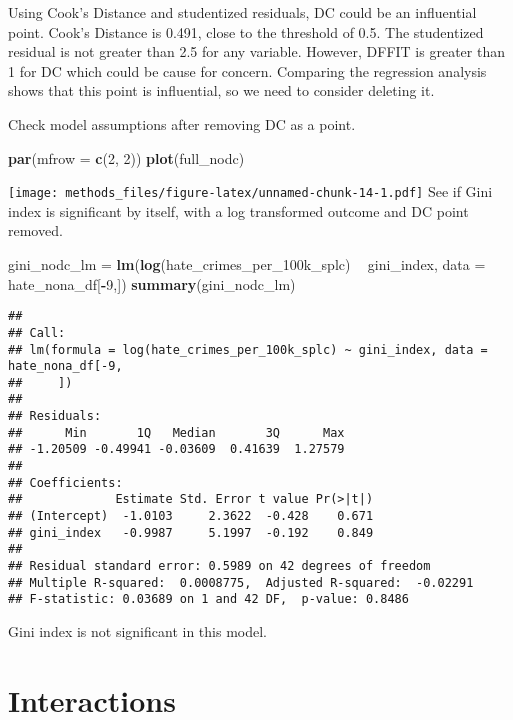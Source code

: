 \documentclass[
]{article}
\newenvironment{Shaded}{\begin{snugshade}}{\end{snugshade}}
\newcommand{\DataTypeTok}[1]{\textcolor[rgb]{0.13,0.29,0.53}{#1}}
\newcommand{\DecValTok}[1]{\textcolor[rgb]{0.00,0.00,0.81}{#1}}
\newcommand{\KeywordTok}[1]{\textcolor[rgb]{0.13,0.29,0.53}{\textbf{#1}}}
\newcommand{\NormalTok}[1]{#1}
\newcommand{\OperatorTok}[1]{\textcolor[rgb]{0.81,0.36,0.00}{\textbf{#1}}}
\newcommand{\StringTok}[1]{\textcolor[rgb]{0.31,0.60,0.02}{#1}}
\begin{document}
Using Cook's Distance and studentized residuals, DC could be an
influential point. Cook's Distance is 0.491, close to the threshold of
0.5. The studentized residual is not greater than 2.5 for any variable.
However, DFFIT is greater than 1 for DC which could be cause for
concern. Comparing the regression analysis shows that this point is
influential, so we need to consider deleting it.

Check model assumptions after removing DC as a point.

\begin{Shaded}
\begin{Highlighting}[]
\KeywordTok{par}\NormalTok{(}\DataTypeTok{mfrow =} \KeywordTok{c}\NormalTok{(}\DecValTok{2}\NormalTok{, }\DecValTok{2}\NormalTok{))}
\KeywordTok{plot}\NormalTok{(full_nodc)}
\end{Highlighting}
\end{Shaded}

\texttt{[image: methods\_files/figure-latex/unnamed-chunk-14-1.pdf]} See
if Gini index is significant by itself, with a log transformed outcome
and DC point removed.

\begin{Shaded}
\begin{Highlighting}[]
\NormalTok{gini_nodc_lm =}\StringTok{ }\KeywordTok{lm}\NormalTok{(}\KeywordTok{log}\NormalTok{(hate_crimes_per_100k_splc) }\OperatorTok{~}\StringTok{ }\NormalTok{gini_index, }\DataTypeTok{data =}\NormalTok{ hate_nona_df[}\OperatorTok{-}\DecValTok{9}\NormalTok{,])}
\KeywordTok{summary}\NormalTok{(gini_nodc_lm)}
\end{Highlighting}
\end{Shaded}

\begin{verbatim}
## 
## Call:
## lm(formula = log(hate_crimes_per_100k_splc) ~ gini_index, data = hate_nona_df[-9, 
##     ])
## 
## Residuals:
##      Min       1Q   Median       3Q      Max 
## -1.20509 -0.49941 -0.03609  0.41639  1.27579 
## 
## Coefficients:
##             Estimate Std. Error t value Pr(>|t|)
## (Intercept)  -1.0103     2.3622  -0.428    0.671
## gini_index   -0.9987     5.1997  -0.192    0.849
## 
## Residual standard error: 0.5989 on 42 degrees of freedom
## Multiple R-squared:  0.0008775,  Adjusted R-squared:  -0.02291 
## F-statistic: 0.03689 on 1 and 42 DF,  p-value: 0.8486
\end{verbatim}

Gini index is not significant in this model.

\hypertarget{interactions}{%
\section{Interactions}\label{interactions}}
\end{document}
